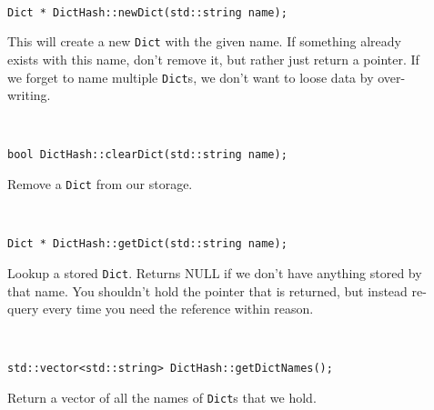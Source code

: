 \begin{description}
\item[] \
\begin{lstlisting}[frame=single]
Dict * DictHash::newDict(std::string name);
\end{lstlisting}
This will create a new {\tt Dict} with the given name. If something already
exists with this name, don't remove it, but rather just return a pointer.
If we forget to name multiple {\tt Dict}s, we don't want to loose data
by over-writing.

\item[] \
\begin{lstlisting}[frame=single]
bool DictHash::clearDict(std::string name);
\end{lstlisting}
Remove a {\tt Dict} from our storage.

\item[] \
\begin{lstlisting}[frame=single]
Dict * DictHash::getDict(std::string name);
\end{lstlisting}
Lookup a stored {\tt Dict}. Returns NULL if we don't have
anything stored by that name. You shouldn't hold the pointer 
that is returned, but instead re-query every time you 
need the reference within reason.

\item[] \
\begin{lstlisting}[frame=single]
std::vector<std::string> DictHash::getDictNames();
\end{lstlisting}
Return a vector of all the names of {\tt Dict}s that we hold.
\end{description}



